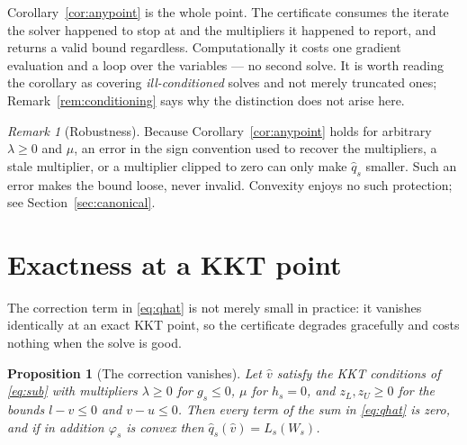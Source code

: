 \documentclass[11pt]{article}
\theoremstyle{plain}
\newtheorem{proposition}[lemma]{Proposition}
\theoremstyle{remark}
\newtheorem{remark}[lemma]{Remark}
\newcommand{\W}{W}
\newcommand{\vhat}{\hat{v}}
\newcommand{\qhat}{\hat{q}}
\begin{document}
Corollary~\ref{cor:anypoint} is the whole point.  The certificate consumes the
iterate the solver happened to stop at and the multipliers it happened to
report, and returns a valid bound regardless.  Computationally it costs one
gradient evaluation and a loop over the variables --- no second solve.  It is
worth reading the corollary as covering \emph{ill-conditioned} solves and not
merely truncated ones; Remark~\ref{rem:conditioning} says why the distinction
does not arise here.

\begin{remark}[Robustness]\label{rem:robust}
Because Corollary~\ref{cor:anypoint} holds for arbitrary $\lambda \ge 0$ and
$\mu$, an error in the sign convention used to recover the multipliers, a stale
multiplier, or a multiplier clipped to zero can only make $\qhat_s$ smaller.
Such an error makes the bound loose, never invalid.  Convexity enjoys no such
protection; see Section~\ref{sec:canonical}.
\end{remark}

\section{Exactness at a KKT point}

The correction term in \eqref{eq:qhat} is not merely small in practice: it
vanishes identically at an exact KKT point, so the certificate degrades
gracefully and costs nothing when the solve is good.

\begin{proposition}[The correction vanishes]\label{prop:kkt}
Let $\vhat$ satisfy the KKT conditions of \eqref{eq:sub} with multipliers
$\lambda \ge 0$ for $g_s \le 0$, $\mu$ for $h_s = 0$, and $z_L, z_U \ge 0$ for
the bounds $l - v \le 0$ and $v - u \le 0$.  Then every term of the sum in
\eqref{eq:qhat} is zero, and if in addition $\varphi_s$ is convex then
$\qhat_s(\vhat) = L_s(\W_s)$.
\end{proposition}
\end{document}

